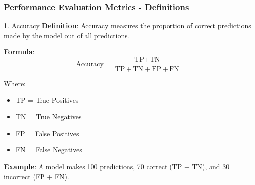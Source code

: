 \documentclass[aspectratio=169]{beamer}
\begin{document}
\begin{frame}[fragile]
    \frametitle{Performance Evaluation Metrics - Definitions}
    \begin{block}{1. Accuracy}
        \textbf{Definition}: Accuracy measures the proportion of correct predictions made by the model out of all predictions.
        
        \textbf{Formula}:
        \begin{equation}
            \text{Accuracy} = \frac{\text{TP} + \text{TN}}{\text{TP} + \text{TN} + \text{FP} + \text{FN}}
        \end{equation}
        
        Where:
        \begin{itemize}
            \item TP = True Positives
            \item TN = True Negatives
            \item FP = False Positives
            \item FN = False Negatives
        \end{itemize}
        
        \textbf{Example}: 
        A model makes 100 predictions, 70 correct (TP + TN), and 30 incorrect (FP + FN).
    \end{block}
\end{frame}
\end{document}
